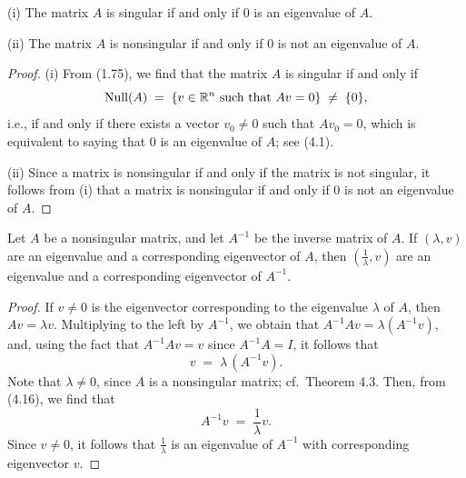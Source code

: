 
\begin{theorem}
(i) The matrix $A$ is singular if and only if $0$ is an eigenvalue of $A$.

(ii) The matrix $A$ is nonsingular if and only if $0$ is not an eigenvalue of $A$.
\end{theorem}

\begin{proof}
(i) From (1.75), we find that the matrix $A$ is singular if and only if
\[
\operatorname{Null}(A) \;=\; \{v \in \mathbb{R}^n \ \text{such that} \ Av = 0\} \;\neq\; \{0\},
\]
i.e., if and only if there exists a vector $v_0 \neq 0$ such that $Av_0 = 0$, which is
equivalent to saying that $0$ is an eigenvalue of $A$; see (4.1).

(ii) Since a matrix is nonsingular if and only if the matrix is not singular, it
follows from (i) that a matrix is nonsingular if and only if $0$ is not an eigenvalue
of $A$.
\end{proof}

\begin{lemma}
Let $A$ be a nonsingular matrix, and let $A^{-1}$ be the inverse matrix of $A$. If
$(\lambda, v)$ are an eigenvalue and a corresponding eigenvector of $A$, then
$(\frac{1}{\lambda}, v)$ are an eigenvalue and a corresponding eigenvector of
$A^{-1}$.
\end{lemma}

\begin{proof}
If $v \neq 0$ is the eigenvector corresponding to the eigenvalue $\lambda$ of $A$,
then $Av = \lambda v$. Multiplying to the left by $A^{-1}$, we obtain that
$A^{-1}Av = \lambda(A^{-1}v)$, and, using the fact that $A^{-1}Av = v$ since
$A^{-1}A = I$, it follows that
\begin{equation}
v \;=\; \lambda\,(A^{-1}v).
\end{equation}
Note that $\lambda \neq 0$, since $A$ is a nonsingular matrix; cf.\ Theorem 4.3. Then,
from (4.16), we find that
\[
A^{-1}v \;=\; \frac{1}{\lambda}v.
\]
Since $v \neq 0$, it follows that $\frac{1}{\lambda}$ is an eigenvalue of $A^{-1}$
with corresponding eigenvector $v$.
\end{proof}

